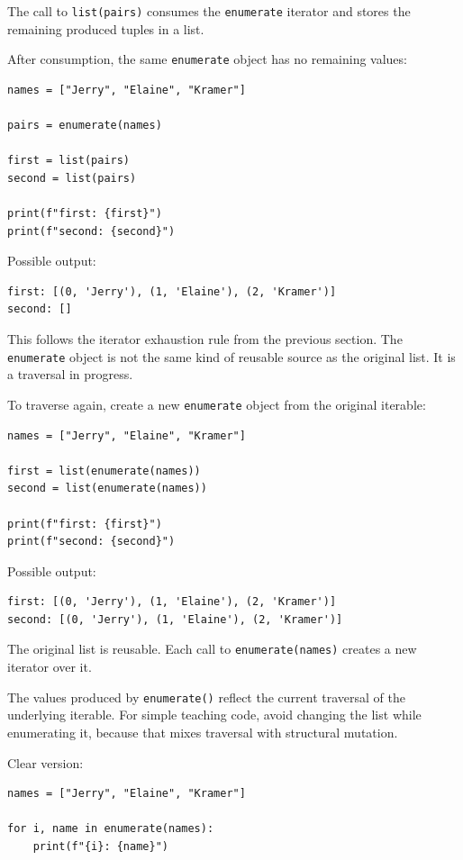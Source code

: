\documentclass[a4paper,twoside]{report}
\begin{document}
The call to \texttt{list(pairs)} consumes the \texttt{enumerate} iterator and stores the remaining produced tuples in a list.

After consumption, the same \texttt{enumerate} object has no remaining values:

\begin{verbatim}
names = ["Jerry", "Elaine", "Kramer"]

pairs = enumerate(names)

first = list(pairs)
second = list(pairs)

print(f"first: {first}")
print(f"second: {second}")
\end{verbatim}

Possible output:

\begin{verbatim}
first: [(0, 'Jerry'), (1, 'Elaine'), (2, 'Kramer')]
second: []
\end{verbatim}

This follows the iterator exhaustion rule from the previous section. The \texttt{enumerate} object is not the same kind of reusable source as the original list. It is a traversal in progress.

To traverse again, create a new \texttt{enumerate} object from the original iterable:

\begin{verbatim}
names = ["Jerry", "Elaine", "Kramer"]

first = list(enumerate(names))
second = list(enumerate(names))

print(f"first: {first}")
print(f"second: {second}")
\end{verbatim}

Possible output:

\begin{verbatim}
first: [(0, 'Jerry'), (1, 'Elaine'), (2, 'Kramer')]
second: [(0, 'Jerry'), (1, 'Elaine'), (2, 'Kramer')]
\end{verbatim}

The original list is reusable. Each call to \texttt{enumerate(names)} creates a new iterator over it.

The values produced by \texttt{enumerate()} reflect the current traversal of the underlying iterable. For simple teaching code, avoid changing the list while enumerating it, because that mixes traversal with structural mutation.

Clear version:

\begin{verbatim}
names = ["Jerry", "Elaine", "Kramer"]

for i, name in enumerate(names):
    print(f"{i}: {name}")
\end{verbatim}
\end{document}
